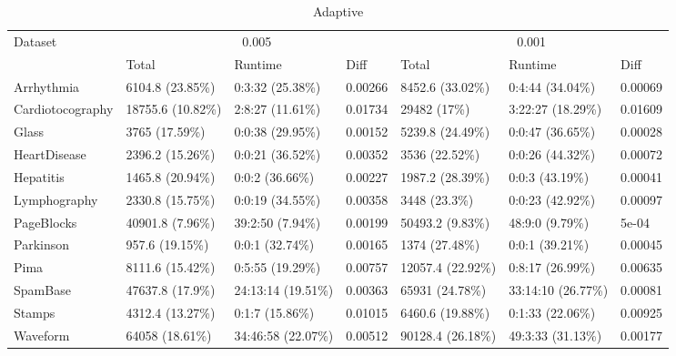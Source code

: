 \documentclass[11pt]{article}
\begin{document}
{\begin{table}[h!]
\centering
\footnotesize
\caption{Adaptive}
\label{tab:adaptive}
\begin{tabular}{|l|lll|lll|}
\hline
\multirow{2}{*}{Dataset} & \multicolumn{3}{c|}{0.005} & \multicolumn{3}{c|}{0.001} \\ \cline{2-7} 
                                   & Total           & Runtime            & Diff     & Total           & Runtime            & Diff        \\ \hline
    Arrhythmia                     & 6104.8 (23.85\%) & 0:3:32 (25.38\%)  &  0.00266 & 8452.6 (33.02\%) & 0:4:44 (34.04\%)  &  0.00069          \\
    Cardiotocography               & 18755.6 (10.82\%) & 2:8:27 (11.61\%)  &  0.01734 & 29482 (17\%) & 3:22:27 (18.29\%)  &  0.01609           \\
    Glass                          & 3765 (17.59\%) & 0:0:38 (29.95\%)  &  0.00152 & 5239.8 (24.49\%) & 0:0:47 (36.65\%)  &  0.00028           \\
    HeartDisease                   & 2396.2 (15.26\%) & 0:0:21 (36.52\%)  &  0.00352 & 3536 (22.52\%) & 0:0:26 (44.32\%)  &  0.00072         \\
    Hepatitis                      & 1465.8 (20.94\%) & 0:0:2 (36.66\%)  &  0.00227 & 1987.2 (28.39\%) & 0:0:3 (43.19\%)  &  0.00041        \\
    Lymphography                   & 2330.8 (15.75\%) & 0:0:19 (34.55\%)  &  0.00358 & 3448 (23.3\%) & 0:0:23 (42.92\%)  &  0.00097         \\
    PageBlocks                     & 40901.8 (7.96\%) & 39:2:50 (7.94\%)  &  0.00199  & 50493.2 (9.83\%) & 48:9:0 (9.79\%)  &  5e-04          \\
    Parkinson                      & 957.6 (19.15\%) & 0:0:1 (32.74\%)  &  0.00165 & 1374 (27.48\%) & 0:0:1 (39.21\%)  &  0.00045        \\
    Pima                           & 8111.6 (15.42\%) & 0:5:55 (19.29\%)  &  0.00757 & 12057.4 (22.92\%) & 0:8:17 (26.99\%)  &  0.00635         \\
    SpamBase                       & 47637.8 (17.9\%) & 24:13:14 (19.51\%)  &  0.00363 & 65931 (24.78\%) & 33:14:10 (26.77\%)  &  0.00081       \\
    Stamps                         & 4312.4 (13.27\%) & 0:1:7 (15.86\%)  &  0.01015 & 6460.6 (19.88\%) & 0:1:33 (22.06\%)  &  0.00925       \\
    Waveform                       & 64058 (18.61\%) & 34:46:58 (22.07\%)  &  0.00512  & 90128.4 (26.18\%) & 49:3:33 (31.13\%)  &  0.00177       \\

\end{tabular}
\end{table}}
\end{document}
